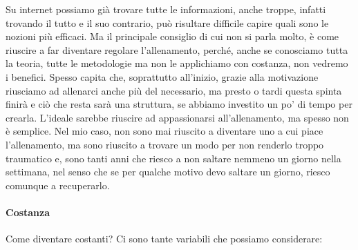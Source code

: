 \documentclass[12pt]{book} %
\begin{document}
Su internet possiamo già trovare tutte le informazioni, anche troppe, infatti trovando il tutto e il suo contrario, può risultare difficile capire quali sono le nozioni più efficaci. Ma il principale consiglio di cui non si parla molto, è come riuscire a far diventare regolare l'allenamento, perché, anche se conosciamo tutta la teoria, tutte le metodologie ma non le applichiamo con costanza, non vedremo i benefici. Spesso capita che, soprattutto all'inizio, grazie alla motivazione riusciamo ad allenarci anche più del necessario, ma presto o tardi questa spinta finirà e ciò che resta sarà una struttura, se abbiamo investito un po' di tempo per crearla. L'ideale sarebbe riuscire ad appassionarsi all'allenamento, ma spesso non è semplice. Nel mio caso, non sono mai riuscito a diventare uno a cui piace l'allenamento, ma sono riuscito a trovare un modo per non renderlo troppo traumatico e, sono tanti anni che riesco a non saltare nemmeno un giorno nella settimana, nel senso che se per qualche motivo devo saltare un giorno, riesco comunque a recuperarlo.

\paragraph{Costanza}

Come diventare costanti?
Ci sono tante variabili che possiamo considerare:
\end{document}
